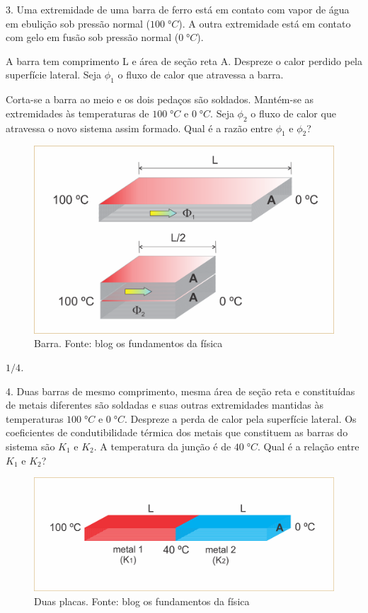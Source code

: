 \documentclass[12pt,twoside]{article}
\newenvironment{resposta*}
{\bf Resposta:\\ }
{}
\begin{document}
3. Uma extremidade de uma barra de ferro está em contato com vapor de água em ebulição sob pressão normal ($100\;°C$). A outra extremidade está em contato com gelo em fusão sob pressão normal ($0\;°C$).


A barra tem comprimento L e área de seção reta A. Despreze o calor perdido pela superfície lateral. Seja $\phi_{1}$ o fluxo de calor que atravessa a barra.


Corta-se a barra ao meio e os dois pedaços são soldados. Mantém-se as extremidades às temperaturas de $100\;°C$ e $0\;°C$. Seja $\phi_{2}$ o fluxo de calor que atravessa o novo sistema assim formado. Qual é a razão entre $\phi_{1}$ e $\phi_{2}$?


\begin{figure}[ht]{}
\centering\includegraphics[width=2.5truein]{exerev-img1.png}
\caption{Barra. Fonte: blog os fundamentos da física}

\end{figure}

\begin{resposta*}
{\it $1/4$.}
\end{resposta*}

4. Duas barras de mesmo comprimento, mesma área de seção reta e constituídas de metais diferentes são soldadas e suas outras extremidades mantidas às temperaturas $100\;°C$ e $0\;°C$. Despreze a perda de calor pela superfície lateral. Os coeficientes de condutibilidade térmica dos metais que constituem as barras do sistema são $K_{1}$ e $K_{2}$. A temperatura da junção é de $40\;°C$. Qual é a relação entre $K_{1}$ e $K_{2}$?


\begin{figure}[ht]{}
\centering\includegraphics[width=2.5truein]{exerev-img2.png}
\caption{Duas placas. Fonte: blog os fundamentos da física}

\end{figure}
\end{document}
